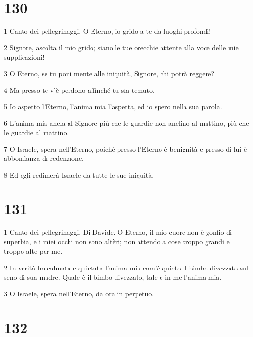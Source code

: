 \chapter{130}

\par 1 Canto dei pellegrinaggi. O Eterno, io grido a te da luoghi profondi!
\par 2 Signore, ascolta il mio grido; siano le tue orecchie attente alla voce delle mie supplicazioni!
\par 3 O Eterno, se tu poni mente alle iniquità, Signore, chi potrà reggere?
\par 4 Ma presso te v'è perdono affinché tu sia temuto.
\par 5 Io aspetto l'Eterno, l'anima mia l'aspetta, ed io spero nella sua parola.
\par 6 L'anima mia anela al Signore più che le guardie non anelino al mattino, più che le guardie al mattino.
\par 7 O Israele, spera nell'Eterno, poiché presso l'Eterno è benignità e presso di lui è abbondanza di redenzione.
\par 8 Ed egli redimerà Israele da tutte le sue iniquità.

\chapter{131}

\par 1 Canto dei pellegrinaggi. Di Davide. O Eterno, il mio cuore non è gonfio di superbia, e i miei occhi non sono altèri; non attendo a cose troppo grandi e troppo alte per me.
\par 2 In verità ho calmata e quietata l'anima mia com'è quieto il bimbo divezzato sul seno di sua madre. Quale è il bimbo divezzato, tale è in me l'anima mia.
\par 3 O Israele, spera nell'Eterno, da ora in perpetuo.

\chapter{132}

